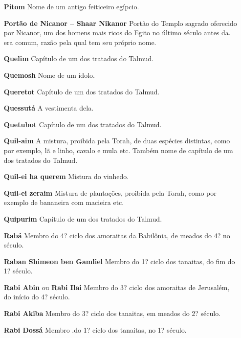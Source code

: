 \begin{itemize}
\item[\textbf{Pitom}] Nome de um antigo feiticeiro egípcio.

\item[\textbf{Portão de Nicanor -- Shaar Nikanor}] Portão do Templo sagrado
oferecido por Nicanor, um dos homens mais ri­cos do Egito no último
século antes da. era comum, razão pela qual tem seu próprio nome.

\item[\textbf{Quelim}] Capítulo de um dos tratados do Talmud.

\item[\textbf{Quemosh}] Nome de um ídolo.

\item[\textbf{Queretot}] Capítulo de um dos trata­dos do Talmud.

\item[\textbf{Quessutá}] A vestimenta dela.

\item[\textbf{Quetubot}] Capítulo de um dos trata­dos do Talmud.

\item[\textbf{Quil-aim}] A mistura, proibida pela Torah, de duas espécies
distintas, co­mo por exemplo, lã e linho, cavalo e mula etc. Também nome
de capítulo de um dos tratados do Talmud.

\item[\textbf{Quil-ei ha querem}] Mistura do vinhedo.

\item[\textbf{Quil-ei zeraim}] Mistura de planta­ções, proibida pela Torah,
como por exemplo de bananeira com macieira etc.

\item[\textbf{Quipurim}] Capítulo de um dos trata­dos do Talmud.

\item[\textbf{Rabá}] Membro do 4? ciclo dos amo­raitas da Babilônia, de
meados do 4? no século.

\item[\textbf{Raban Shimeon ben Gamliel}] Mem­bro do 1? ciclo dos tanaitas,
do fim do 1? século.

\item[\textbf{Rabi Abin} ou \textbf{Rabi Ilai}] Membro do
3? ciclo dos amoraitas de Jerusalém, do início do 4? século.

\item[\textbf{Rabi Akiba}] Membro do 3? ciclo dos tanaitas, em meados do 2?
século.

\item[\textbf{Rabi Dossá}] Membro .do 1? ciclo dos tanaitas, no 1? século.


\end{itemize}
